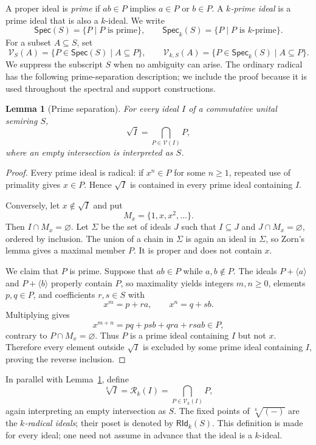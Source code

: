 \documentclass[12pt,leqno]{amsart}
\newcommand{\Spec}{\mathsf{Spec}}
\newcommand{\Speck}{\mathsf{Spec}_{k}}
\newcommand{\RIdk}{\mathsf{RId}_{k}}
\newtheorem{lemma}[theorem]{Lemma}
\theoremstyle{definition}
\numberwithin{equation}{section}
\theoremstyle{remark}
\begin{document}
A proper ideal is \emph{prime} if \(ab\in P\) implies \(a\in P\) or \(b\in P\). A \emph{$k$-prime ideal} is a prime ideal that is also a $k$-ideal. We write
\[
\Spec(S)=\{P\mid P\text{ is prime}\},
\qquad
\Speck(S)=\{P\mid P\text{ is $k$-prime}\}.
\]
For a subset $A\subseteq S$, set
\[
\mathcal V_S(A)=\{P\in\Spec(S)\mid A\subseteq P\},
\qquad
\mathcal V_{k,S}(A)=\{P\in\Speck(S)\mid A\subseteq P\}.
\]
We suppress the subscript $S$ when no ambiguity can arise. The ordinary radical has the following prime-separation description; we include the proof because it is used throughout the spectral and support constructions.

\begin{lemma}[Prime separation]\label{lem:ordinary-radical-prime-intersection}
For every ideal $I$ of a commutative unital semiring $S$,
\[
\sqrt I=\bigcap_{P\in\mathcal V(I)}P,
\]
where an empty intersection is interpreted as $S$.
\end{lemma}

\begin{proof}
Every prime ideal is radical: if $x^n\in P$ for some $n\geq1$, repeated use of primality gives $x\in P$. Hence \(\sqrt I\) is contained in every prime ideal containing $I$.

Conversely, let $x\notin\sqrt I$ and put
\[
M_x=\{1,x,x^2,\ldots\}.
\]
Then $I\cap M_x=\varnothing$. Let \(\Sigma\) be the set of ideals $J$ such that
\(I\subseteq J\) and \(J\cap M_x=\varnothing\), ordered by inclusion. The union of a chain in \(\Sigma\) is again an ideal in \(\Sigma\), so Zorn's lemma gives a maximal member $P$. It is proper and does not contain $x$.

We claim that $P$ is prime. Suppose that $ab\in P$ while $a,b\notin P$. The ideals
\(P+\langle a\rangle\) and \(P+\langle b\rangle\) properly contain $P$, so maximality yields integers $m,n\geq0$, elements $p,q\in P$, and coefficients $r,s\in S$ with
\[
x^m=p+ra,
\qquad
x^n=q+sb.
\]
Multiplying gives
\[
x^{m+n}=pq+psb+qra+rsab\in P,
\]
contrary to \(P\cap M_x=\varnothing\). Thus $P$ is a prime ideal containing $I$ but not $x$. Therefore every element outside \(\sqrt I\) is excluded by some prime ideal containing $I$, proving the reverse inclusion.
\end{proof}

In parallel with Lemma~\ref{lem:ordinary-radical-prime-intersection}, define
\[
\sqrt[k]{I}=\mathcal R_k(I)=\bigcap_{P\in\mathcal V_k(I)}P,
\]
again interpreting an empty intersection as $S$. The fixed points of \(\sqrt[k]{(-)}\) are the \emph{$k$-radical ideals}; their poset is denoted by \(\RIdk(S)\). This definition is made for every ideal; one need not assume in advance that the ideal is a $k$-ideal.
\end{document}
